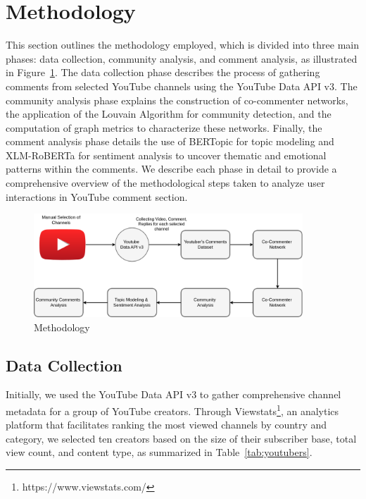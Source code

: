 \documentclass[12pt]{article}
\begin{document}
\section{Methodology}

This section outlines the methodology employed, which is divided into three main phases: 
data collection, community analysis, and comment analysis, as illustrated in Figure~\ref{fig:methodology}. 
The data collection phase describes the process of gathering comments from selected YouTube channels 
using the YouTube Data API v3. The community analysis phase explains the construction of co-commenter 
networks, the application of the Louvain Algorithm for community detection, and the computation of 
graph metrics to characterize these networks. Finally, the comment analysis phase details the use of 
BERTopic for topic modeling and XLM-RoBERTa for sentiment analysis to uncover thematic and emotional 
patterns within the comments. We describe each phase in detail to provide a comprehensive overview 
of the methodological steps taken to analyze user interactions in YouTube comment section.

\begin{figure}[t!]
    \centering
    \includegraphics[keepaspectratio,width=0.9\textwidth]{./imgs/tcc_methodology.png}
    \caption{Methodology}
    \label{fig:methodology}
\end{figure}

\subsection{Data Collection}

Initially, we used the YouTube Data API v3 to gather comprehensive channel metadata for a group of 
YouTube creators. Through Viewstats\footnote{https://www.viewstats.com/}, an analytics platform 
that facilitates ranking the most viewed channels by country and category, we selected ten creators 
based on the size of their subscriber base, total view count, and content type, as summarized in 
Table~\ref{tab:youtubers}.
\end{document}
